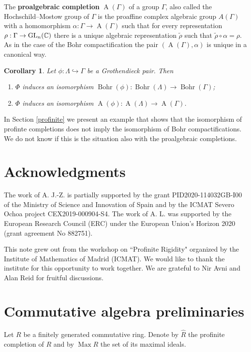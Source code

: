 \documentclass{amsart}
\newtheorem{cor}[lem]{Corollary}
\theoremstyle{definition}
\theoremstyle{remark}
\DeclareMathOperator{\B}{Bohr}
\DeclareMathOperator{\A}{A}
\DeclareMathOperator{\Max}{Max}
\newcommand{\CC}{\mathbb{C}}
\begin{document}
  The {\bf proalgebraic completion} $\A(\Gamma)$ of a group $\Gamma$, also called the Hochschild\-–Mostow group of  $\Gamma$
is the  proaffine complex algebraic  group $A(\Gamma)$ with a homomorphism
$\alpha: \Gamma\to \A(\Gamma)$ such that for every representation $\rho:\Gamma\to \GL_n(\CC)$   there is a unique algebraic representation $\widetilde  \rho$ such that  $\widetilde  \rho\circ \alpha=\rho$. As in the case of the Bohr compactification the pair $(\A(\Gamma),\alpha)$ is unique in a canonical way.

\begin{cor}\label{bohr}
Let $\phi:\Lambda \hookrightarrow \Gamma$ be a Grothendieck pair. Then 
\begin{enumerate}
\item $\Phi$ induces an isomorphism $\B(\phi):\B(\Lambda)\to \B(\Gamma)$;
\item $\Phi$ induces an isomorphism $\A(\phi): \A(\Lambda)\to \A(\Gamma)$.
\end{enumerate}
\end{cor}
In Section \ref{profinite} we present an example that shows that the isomorphism of profinte completions does not imply the isomorphism of Bohr compactifications. We do not know if this is the situation also with the proalgebraic completions.

\section*{Acknowledgments}

The work of  A. J.-Z.  is partially supported by the grant  PID2020-114032GB-I00 of the Ministry of Science and Innovation of Spain  and by the ICMAT Severo Ochoa project  CEX2019-000904-S4. The work of A. L. was supported by the European Research Council (ERC) under the European Union’s Horizon 2020 (grant agreement No 882751).

   This note grew out from  the workshop on ``Profinite Rigidity" organized by the Institute of Mathematics of Madrid (ICMAT). We would like to thank the institute for this opportunity to work together.  We are   grateful to Nir Avni and Alan Reid for  fruitful discussions.




 \section{Commutative algebra preliminaries}
 Let  $R$  be a finitely generated  commutative ring. Denote by  $\widehat R$ the profinite completion of $R$ and by $\Max R$   the set of its maximal ideals. 
\end{document}
